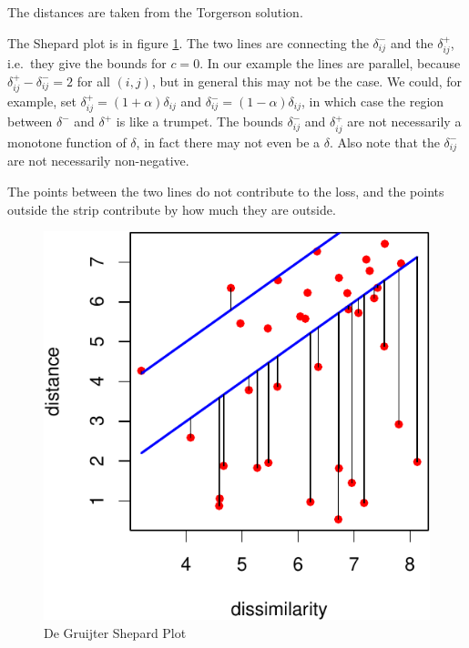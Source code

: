 \documentclass[
  12pt,
]{article}
\begin{document}
The distances are
taken from the Torgerson solution.

The Shepard plot is in figure \ref{fig:bandplot}. The two
lines are connecting the \(\delta_{ij}^-\) and the \(\delta_{ij}^+\), i.e.~they give
the bounds for \(c=0\). In our example the lines are parallel, because \(\delta_{ij}^+-\delta_{ij}^-=2\) for all \((i,j)\), but in general this may not be the case.
We could, for example, set \(\delta_{ij}^+=(1+\alpha)\delta_{ij}\) and
\(\delta_{ij}^-=(1-\alpha)\delta_{ij}\), in which case the region between \(\delta^-\)
and \(\delta^+\) is like a trumpet.
The bounds \(\delta_{ij}^-\) and \(\delta_{ij}^+\) are not necessarily a monotone function of \(\delta\), in fact there may not even be a \(\delta\). Also note that the \(\delta_{ij}^-\) are not necessarily non-negative.

The points between the two lines do not contribute to the loss, and
the points outside the strip contribute by how much they are outside.

\begin{figure}

{\centering \includegraphics{smacofAC_files/figure-latex/bandplot-1} 

}

\caption{De Gruijter Shepard Plot}\label{fig:bandplot}
\end{figure}
\end{document}
